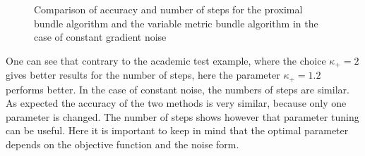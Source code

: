 \begin{figure}[ht]
	\begin{subfigure}{0.49\textwidth}
	\end{subfigure}
	\begin{subfigure}{0.49\textwidth}
	\end{subfigure}
	\caption{Comparison of accuracy and number of steps for the proximal bundle algorithm and the variable metric bundle algorithm in the case of constant gradient noise}%
	\label{fig_const_grad_noise_comp}%
\end{figure}


One can see that contrary to the academic test example, where the choice \(\kappa_+ = 2\) gives better results for the number of steps, here the parameter \(\kappa_+=1.2\) performs better.
In the case of constant noise, the numbers of steps are similar.
As  expected the accuracy of the two methods is very similar, because only one parameter is changed. The number of steps shows however that parameter tuning can be useful. Here it is important to keep in mind that the optimal parameter depends on the objective function and the noise form.

